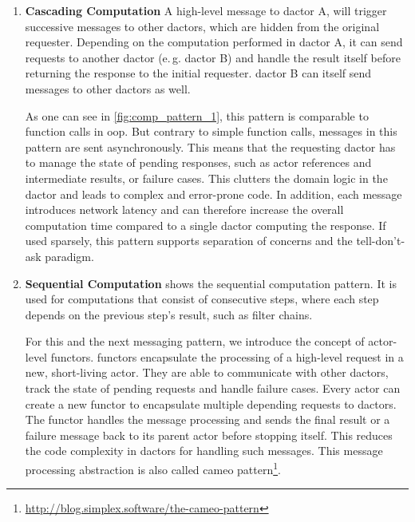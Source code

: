     \begin{enumerate}
      \item\label{enum:comp_pattern_1} \textbf{Cascading Computation}
        A high-level message to \gls{dactor} A, will trigger successive messages to other \glspl{dactor}, which are hidden from the original requester.
        Depending on the computation performed in \gls{dactor} A, it can send requests to another \gls{dactor} (e.\,g. \gls{dactor} B) and handle the result itself before returning the response to the initial requester.
        \Gls{dactor} B can itself send messages to other \glspl{dactor} as well.
        
        As one can see in \cref{fig:comp_pattern_1}, this pattern is comparable to function calls in \gls{oop}.
        But contrary to simple function calls, messages in this pattern are sent asynchronously.
        This means that the requesting \gls{dactor} has to manage the state of pending responses, such as actor references and intermediate results, or failure cases.
        This clutters the domain logic in the \gls{dactor} and leads to complex and error-prone code.
        In addition, each message introduces network latency and can therefore increase the overall computation time compared to a single \gls{dactor} computing the response.
        If used sparsely, this pattern supports separation of concerns and the tell-don't-ask paradigm.

      \item\label{enum:comp_pattern_2} \textbf{Sequential Computation}
         shows the sequential computation pattern.
        It is used for computations that consist of consecutive steps, where each step depends on the previous step's result, such as filter chains.

        For this and the next messaging pattern, we introduce the concept of actor-level \glspl{functor}.
        \Glspl{functor} encapsulate the processing of a high-level request in a new, short-living actor.
        They are able to communicate with other \glspl{dactor}, track the state of pending requests and handle failure cases.
        Every actor can create a new \gls{functor} to encapsulate multiple depending requests to \glspl{dactor}.
        The \gls{functor} handles the message processing and sends the final result or a failure message back to its parent actor before stopping itself.
        This reduces the code complexity in \glspl{dactor} for handling such messages.
        This message processing abstraction is also called cameo pattern\footnote{\url{http://blog.simplex.software/the-cameo-pattern}}.


\end{enumerate}
